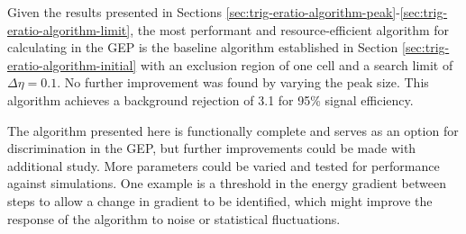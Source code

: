 
Given the results presented in Sections
\ref{sec:trig-eratio-algorithm-peak}-\ref{sec:trig-eratio-algorithm-limit}, the
most performant and resource-efficient algorithm for calculating \eratio in the
\ac{GEP} is the baseline algorithm established in Section
\ref{sec:trig-eratio-algorithm-initial} with an exclusion region of one cell and
a search limit of $\Delta\eta=0.1$. No further improvement was found by varying
the peak size. This algorithm achieves a background rejection of 3.1 for 95\%
signal efficiency.


The \eratio algorithm presented here is functionally complete and serves as an
option for \egamma discrimination in the \ac{GEP}, but further improvements
could be made with additional study.
More parameters could be varied and tested for performance against simulations.
One example is a threshold in the energy gradient between steps to allow a
change in gradient to be identified, which might improve the response of the
algorithm to noise or statistical fluctuations.


